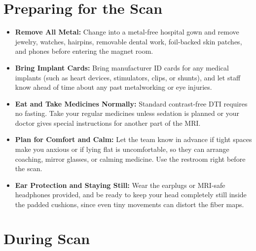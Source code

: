 \section{Preparing for the Scan}

\begin{itemize}
    \item \textbf{Remove All Metal:} Change into a metal-free hospital gown and remove jewelry, watches, hairpins, removable dental work, foil-backed skin patches, and phones before entering the magnet room.
    \item \textbf{Bring Implant Cards:} Bring manufacturer ID cards for any medical implants (such as heart devices, stimulators, clips, or shunts), and let staff know ahead of time about any past metalworking or eye injuries.
    \item \textbf{Eat and Take Medicines Normally:} Standard contrast-free DTI requires no fasting. Take your regular medicines unless sedation is planned or your doctor gives special instructions for another part of the MRI.
    \item \textbf{Plan for Comfort and Calm:} Let the team know in advance if tight spaces make you anxious or if lying flat is uncomfortable, so they can arrange coaching, mirror glasses, or calming medicine. Use the restroom right before the scan.
    \item \textbf{Ear Protection and Staying Still:} Wear the earplugs or MRI-safe headphones provided, and be ready to keep your head completely still inside the padded cushions, since even tiny movements can distort the fiber maps.
\end{itemize}

\section{During Scan}

